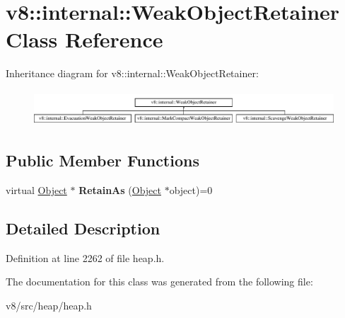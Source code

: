 \hypertarget{classv8_1_1internal_1_1WeakObjectRetainer}{}\section{v8\+:\+:internal\+:\+:Weak\+Object\+Retainer Class Reference}
\label{classv8_1_1internal_1_1WeakObjectRetainer}
Inheritance diagram for v8\+:\+:internal\+:\+:Weak\+Object\+Retainer\+:\begin{figure}[H]
\begin{center}
\leavevmode
\includegraphics[height=1.328588cm]{classv8_1_1internal_1_1WeakObjectRetainer}
\end{center}
\end{figure}
\subsection*{Public Member Functions}
\begin{DoxyCompactItemize}
\item 
\mbox{\label{classv8_1_1internal_1_1WeakObjectRetainer_a603b5e5e9baf52030a4baa4ef249fe81}} 
virtual \mbox{\hyperlink{classv8_1_1internal_1_1Object}{Object}} $\ast$ {\bfseries Retain\+As} (\mbox{\hyperlink{classv8_1_1internal_1_1Object}{Object}} $\ast$object)=0
\end{DoxyCompactItemize}


\subsection{Detailed Description}


Definition at line 2262 of file heap.\+h.



The documentation for this class was generated from the following file\+:\begin{DoxyCompactItemize}
\item 
v8/src/heap/heap.\+h\end{DoxyCompactItemize}
